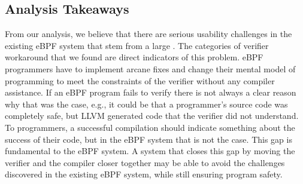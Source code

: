 %


\subsection{Analysis Takeaways}
From our analysis, we believe that there are serious usability challenges in the
    existing eBPF system that stem from a large \gap{}. %
The categories of verifier workaround that we found are direct indicators of this problem.
eBPF programmers have to implement arcane fixes and change their mental model of
    programming to meet the constraints of the verifier without any compiler assistance.
If an eBPF program fails to verify there is not always a clear reason why that was the case, e.g.,
it could be that a programmer's source code was completely safe, but LLVM generated code that the verifier did not understand.
To programmers, a successful compilation should indicate something about the success of their code, but in the eBPF system that is not the case.
This gap is fundamental to the eBPF system.
A system that closes this gap by moving the verifier and the compiler closer together may be able to avoid the challenges discovered in the existing eBPF system, while still ensuring program safety.


